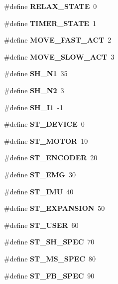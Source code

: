 \begin{DoxyCompactItemize}
\item 
\mbox{\label{globals_8h_a04e38ed0acd535042d77f459ce075ad0}} 
\#define {\bfseries R\+E\+L\+A\+X\+\_\+\+S\+T\+A\+TE}~0
\item 
\mbox{\label{globals_8h_a109b31985592a8efa8d8d772c345d66a}} 
\#define {\bfseries T\+I\+M\+E\+R\+\_\+\+S\+T\+A\+TE}~1
\item 
\mbox{\label{globals_8h_a8e0a147f2c0cf9f8e529346ec0753ca2}} 
\#define {\bfseries M\+O\+V\+E\+\_\+\+F\+A\+S\+T\+\_\+\+A\+CT}~2
\item 
\mbox{\label{globals_8h_ad0f7f935c66d64eb042fe250aa94d027}} 
\#define {\bfseries M\+O\+V\+E\+\_\+\+S\+L\+O\+W\+\_\+\+A\+CT}~3
\item 
\#define \textbf{ S\+H\+\_\+\+N1}~35
\item 
\#define \textbf{ S\+H\+\_\+\+N2}~3
\item 
\#define \textbf{ S\+H\+\_\+\+I1}~-\/1
\item 
\mbox{\label{globals_8h_a5f8f4a24628c7191c9adde97ae751bf2}} 
\#define {\bfseries S\+T\+\_\+\+D\+E\+V\+I\+CE}~0
\item 
\mbox{\label{globals_8h_a911881bfa4a82a79f351f7a8a8ea40d1}} 
\#define {\bfseries S\+T\+\_\+\+M\+O\+T\+OR}~10
\item 
\mbox{\label{globals_8h_a642639720f787f90dab85f94d4be660c}} 
\#define {\bfseries S\+T\+\_\+\+E\+N\+C\+O\+D\+ER}~20
\item 
\mbox{\label{globals_8h_afca454140c3233621eaa719a25a1c4b5}} 
\#define {\bfseries S\+T\+\_\+\+E\+MG}~30
\item 
\mbox{\label{globals_8h_a6f71b4081fa44d0458fa27e891527315}} 
\#define {\bfseries S\+T\+\_\+\+I\+MU}~40
\item 
\mbox{\label{globals_8h_a3aacefdd9f8dddbb7b55bcd39bf22792}} 
\#define {\bfseries S\+T\+\_\+\+E\+X\+P\+A\+N\+S\+I\+ON}~50
\item 
\mbox{\label{globals_8h_a16d74d98ce4fcdfb20501e89e37ff053}} 
\#define {\bfseries S\+T\+\_\+\+U\+S\+ER}~60
\item 
\mbox{\label{globals_8h_a788bae111bb48b9aa005ecf765ce1e94}} 
\#define {\bfseries S\+T\+\_\+\+S\+H\+\_\+\+S\+P\+EC}~70
\item 
\mbox{\label{globals_8h_a09fa5a059f637c6e635e27cbb1b437f8}} 
\#define {\bfseries S\+T\+\_\+\+M\+S\+\_\+\+S\+P\+EC}~80
\item 
\mbox{\label{globals_8h_aad8e3965151790073226b9ec124c0808}} 
\#define {\bfseries S\+T\+\_\+\+F\+B\+\_\+\+S\+P\+EC}~90
\item 
\mbox{\label{globals_8h_a8d9602ba2be82a71e64ec82dc5ce72ba}} 

\end{DoxyCompactItemize}
